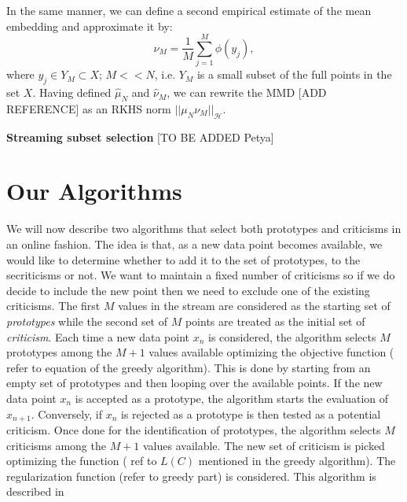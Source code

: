 \documentclass{article}
\begin{document}
	In the same manner, we can define a second empirical estimate of the mean embedding and approximate it by:
	\begin{equation}
	\label{eq:nuhat}
	\nu_M = \frac{1}{M} \sum_{j=1}^{M} \phi(y_j),
	\end{equation}
	where $y_j \in Y_M \subset X$; $M<<N$, i.e. $Y_M$ is a small subset of the full points in the set $X$. Having defined $\hat{\mu}_N$ and $\hat{\nu}_M$, we can rewrite the MMD [ADD REFERENCE] as an RKHS norm $|| \mu_N \nu_M||_{\mathcal{H}}$.
	
	\textbf{Streaming subset selection}
	[TO BE ADDED Petya]
	
	
	\section{Our Algorithms}
	We will now describe two algorithms that select both prototypes and criticisms in an online fashion. The idea is that, as a new data point becomes available, we would like to determine whether to add it to the set of prototypes, to the secriticisms or not. We want to maintain a fixed number of criticisms so if we do decide to include the new point then we need to exclude one of the existing criticisms.
	The first $M$ values in the stream are considered as the starting set of \textit{prototypes} while the second set of $M$ points are treated as the initial set of \textit{criticism}. Each time a new data point $x_n$ is considered, the algorithm selects $M$ prototypes among the $M+1$ values available optimizing the objective function ( refer to equation of the greedy algorithm). This is done by starting from an empty set of prototypes and then looping over the available points. If the new data point $x_n$ is accepted as a prototype, the algorithm starts the evaluation of $x_{n+1}$. Conversely, if $x_n$ is rejected as a prototype is then tested as a potential criticism. Once done for the identification of prototypes, the algorithm selects $M$ criticisms among the $M+1$ values available. The new set of criticism is picked optimizing the function ( ref to $L(C)$ mentioned in the greedy algorithm). The regularization function (refer to greedy part) is considered. This algorithm is described in 
	
\end{document}

